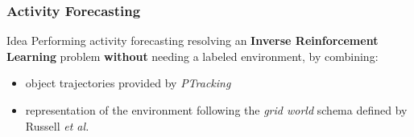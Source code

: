 \begin{frame}
	\frametitle{Activity Forecasting}
	
	\vspace{0.35cm}
	
	\begin{block}{Idea}
		Performing activity forecasting resolving an \textbf{Inverse Reinforcement
		Learning} problem \textbf{without} needing a labeled environment, by combining:
		
		\begin{itemize}
			\item object trajectories provided by \emph{PTracking}
			\item representation of the environment following the \emph{grid world} schema
				  defined by Russell \emph{et al.}
		\end{itemize}
	\end{block}
	
	\begin{center}
	\end{center}
\end{frame}

